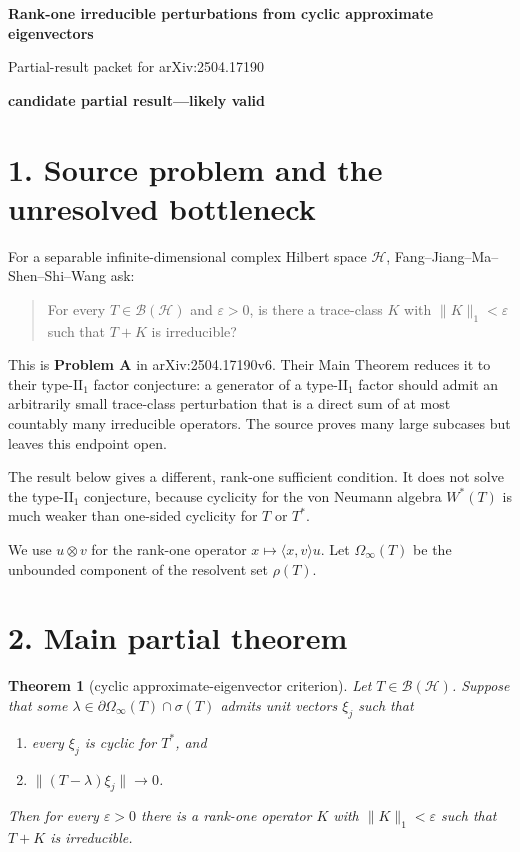 \documentclass[11pt]{article}
\newtheorem{theorem}{Theorem}
\newcommand{\B}{\mathcal B}
\newcommand{\Hh}{\mathcal H}
\newcommand{\status}{\textcolor{blue!60!black}{\textbf{candidate partial result---likely valid}}}
\begin{document}
\begin{center}
{\Large\bfseries Rank-one irreducible perturbations from cyclic approximate eigenvectors}\par
\vspace{0.35em}
{\large Partial-result packet for arXiv:2504.17190}\par
\vspace{0.45em}
\status
\end{center}

\section*{1. Source problem and the unresolved bottleneck}

For a separable infinite-dimensional complex Hilbert space $\Hh$, Fang--Jiang--Ma--Shen--Shi--Wang ask:

\begin{quote}
For every $T\in\B(\Hh)$ and $\varepsilon>0$, is there a trace-class $K$ with
$\lVert K\rVert_1<\varepsilon$ such that $T+K$ is irreducible?
\end{quote}

This is \textbf{Problem A} in arXiv:2504.17190v6.  Their Main Theorem reduces it to their type-$\mathrm{II}_1$ factor conjecture: a generator of a type-$\mathrm{II}_1$ factor should admit an arbitrarily small trace-class perturbation that is a direct sum of at most countably many irreducible operators.  The source proves many large subcases but leaves this endpoint open.

The result below gives a different, rank-one sufficient condition.  It does not solve the type-$\mathrm{II}_1$ conjecture, because cyclicity for the von Neumann algebra $W^*(T)$ is much weaker than one-sided cyclicity for $T$ or $T^*$.

We use $u\otimes v$ for the rank-one operator $x\mapsto\langle x,v\rangle u$.  Let $\Omega_\infty(T)$ be the unbounded component of the resolvent set $\rho(T)$.

\section*{2. Main partial theorem}

\begin{theorem}[cyclic approximate-eigenvector criterion]\label{thm:main}
Let $T\in\B(\Hh)$.  Suppose that some
$\lambda\in\partial\Omega_\infty(T)\cap\sigma(T)$ admits unit vectors $\xi_j$ such that
\begin{enumerate}
\item every $\xi_j$ is cyclic for $T^*$, and
\item $\lVert(T-\lambda)\xi_j\rVert\to0$.
\end{enumerate}
Then for every $\varepsilon>0$ there is a rank-one operator $K$ with
$\lVert K\rVert_1<\varepsilon$ such that $T+K$ is irreducible.
\end{theorem}
\end{document}
